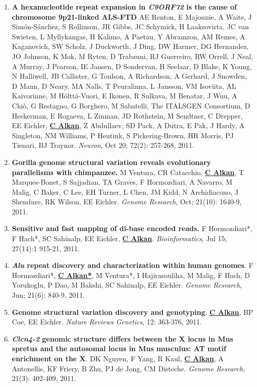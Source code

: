 \begin{enumerate}
\item
{\bf A hexanucleotide repeat expansion in \textit{C9ORF72} is the cause of chromosome 9p21-linked ALS-FTD}  
AE Renton, E Majounie, A Waite, J Simón-Sánchez, S Rollinson, JR Gibbs, JC Schymick, H Laaksovirta, JC van Swieten, L Myllykangas, 
H Kalimo, A Paetau, Y Abramzon, AM Remes, A Kaganovich, SW Scholz, J Duckworth, J Ding, DW Harmer, DG Hernandez, JO Johnson, 
K Mok, M Ryten, D Trabzuni, RJ Guerreiro, RW Orrell, J Neal, A Murray, J Pearson, IE Jansen, D Sondervan, H Seelaar, D Blake, 
K Young, N Halliwell, JB Callister, G Toulson, A Richardson, A Gerhard, J Snowden, D Mann, D Neary, MA Nalls, T Peuralinna, 
L Jansson, VM Isoviita, AL Kaivorinne, M Hölttä-Vuori, E Ikonen, R Sulkava, M Benatar, J Wuu, A Chiò, G Restagno, 
G Borghero, M Sabatelli, The ITALSGEN Consortium, D Heckerman, E Rogaeva, L Zinman, JD Rothstein, M Sendtner, C Drepper, EE Eichler, 
{\bf {\underline {C Alkan}}}, Z Abdullaev, SD Pack, A Dutra, E Pak, J Hardy, A Singleton, NM Williams, P Heutink, S Pickering-Brown, 
HR Morris, PJ Tienari, BJ Traynor. {\em Neuron}, Oct 20;  72(2): 257-268, 2011.

\item
{\bf Gorilla genome structural variation reveals evolutionary parallelisms with chimpanzee.}
M Ventura, CR Catacchio, {\bf {\underline {C Alkan}}}, T Marques-Bonet, S Sajjadian, TA Graves, F Hormozdiari, A Navarro, 
M Malig, C Baker, C Lee, EH Turner, L Chen, JM Kidd, N Archidiacono, J Shendure, RK Wilson, EE Eichler.
{\em Genome Research}, Oct;  21(10): 1640-9, 2011.


\item
{\bf Sensitive and fast mapping of di-base encoded reads.}
F Hormozdiari*, F Hach*, SC Sahinalp, EE Eichler, {\bf {\underline {C Alkan}}}.
{\em Bioinformatics}, Jul 15;  27(14):1 915-21, 2011.



\item
{\bf \textit {Alu} repeat discovery and characterization within human genomes}.
F Hormozdiari*, {\bf {\underline {C Alkan*}}}, M Ventura*, I Hajirasouliha, M Malig, 
F Hach, D Yorukoglu, P Dao, M Bakshi, SC Sahinalp, EE Eichler.
{\em Genome Research}, Jun;  21(6): 840-9, 2011.

\item
{\bf Genome structural variation discovery and genotyping}. 
{\bf {\underline {C Alkan}}}, BP Coe, EE Eichler.
{\em Nature Reviews Genetics}, 12: 363-376, 2011.


\item
{\bf {\em Clcn4-2} genomic structure differs between the X locus in Mus spretus and the autosomal 
locus in Mus musculus: AT motif enrichment on the X}.  
DK Nguyen, F Yang, R Kaul, {\bf {\underline {C Alkan}}}, A Antonellis, KF Friery, 
B Zhu, PJ de Jong, CM Disteche. 
{\em Genome Research}, 21(3): 402-409, 2011.



\end{enumerate}
